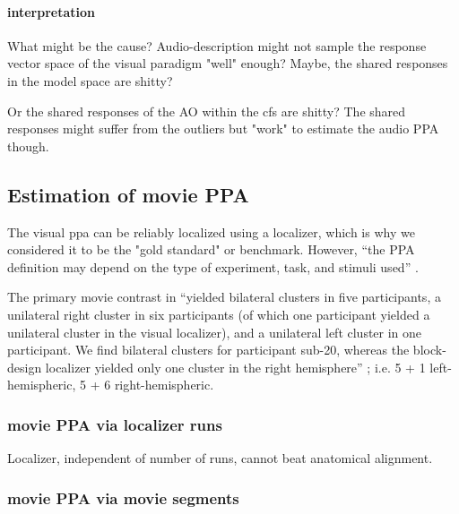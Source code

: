 \paragraph{interpretation}
%
What might be the cause?
%
Audio-description might not sample the response vector space of the visual
paradigm "well" enough?
%
Maybe, the shared responses in the model space are shitty?

Or the shared responses of the AO within the \ac{cfs} are shitty?
%
The shared responses might suffer from the outliers but "work" to estimate the
audio PPA though.



\subsection{Estimation of movie PPA}


The visual \ac{ppa} can be reliably localized using a localizer, which is why we
considered it to be the "gold standard" or benchmark.
%
However, ``the PPA definition may depend on the type of experiment, task, and
stimuli used'' \citep{weiner2018defining}.

%
The primary movie contrast in \citet{haeusler2022processing} ``yielded bilateral
clusters in five participants, a unilateral right cluster in six participants
(of which one participant yielded a unilateral cluster in the visual localizer),
and a unilateral left cluster in one participant. We find bilateral clusters for
participant sub-20, whereas the block-design localizer yielded only one cluster
in the right hemisphere'' \citep{haeusler2022processing};
%
i.e. 5 + 1  left-hemispheric, 5 + 6 right-hemispheric.


\subsubsection{movie PPA via localizer runs}

Localizer, independent of number of runs, cannot beat anatomical alignment.


\subsubsection{movie PPA via movie segments}

